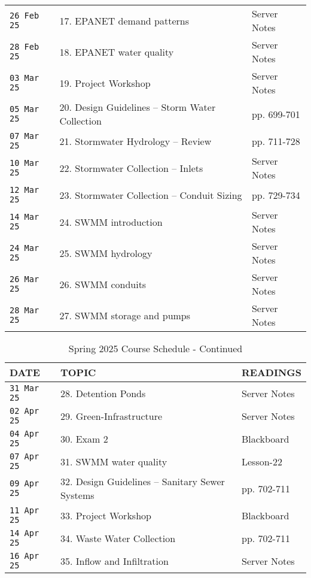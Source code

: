 \documentclass[12pt]{article}
\begin{document}
\begin{center}
\begin{table}[ht!]
\begin{tabular}{| p{0.8in} | p{3.5in} | p{2.0in} | }
\texttt{26 Feb 25} & 17. EPANET demand patterns & Server Notes \\
\texttt{28 Feb 25} & 18. EPANET water quality & Server Notes \\
\hline
\texttt{03 Mar 25} & 19. Project Workshop & Server Notes  \\
\texttt{05 Mar 25} & 20. Design Guidelines -- Storm Water Collection & \cite{Gupta2017} pp. 699-701 \\
\texttt{07 Mar 25} & 21. Stormwater Hydrology -- Review  & \cite{Gupta2017} pp. 711-728 \\
\hline
\texttt{10 Mar 25} & 22. Stormwater Collection --  Inlets & Server Notes\\
\texttt{12 Mar 25} & 23. Stormwater Collection --  Conduit Sizing & \cite{Gupta2017} pp. 729-734\\
\texttt{14 Mar 25} & 24. SWMM introduction & Server Notes \\
\hline
\texttt{24 Mar 25} & 25. SWMM hydrology & Server Notes  \\
\texttt{26 Mar 25} & 26. SWMM conduits & Server Notes \\ 
\texttt{28 Mar 25} & 27. SWMM storage and pumps & Server Notes \\ 
\hline
   \end{tabular}
   \label{tab:sp2025scheduleA}
\end{table}
\clearpage
\begin{table}[ht!]
 \caption{Spring 2025 Course Schedule - Continued}
   \begin{tabular}{| p{0.8in} | p{3.5in} | p{2.0in} |} 
\hline
\hline
DATE & TOPIC & READINGS \\
\hline
\hline
\texttt{31 Mar 25} & 28. Detention Ponds & Server Notes \\
\texttt{02 Apr 25} & 29. Green-Infrastructure & Server Notes \\
\texttt{04 Apr 25} & 30. Exam 2 & Blackboard \\
\hline
\texttt{07 Apr 25} & 31. SWMM water quality & Lesson-22 \\
\texttt{09 Apr 25} & 32. Design Guidelines -- Sanitary Sewer Systems & \cite{Gupta2017} pp. 702-711 \\
\texttt{11 Apr 25} & 33. Project Workshop & Blackboard \\
\hline
\texttt{14 Apr 25} & 34. Waste Water Collection & \cite{Gupta2017} pp. 702-711 \\
\texttt{16 Apr 25} & 35. Inflow and Infiltration & Server Notes \\

\end{tabular}
\end{table}
\end{center}
\end{document}
